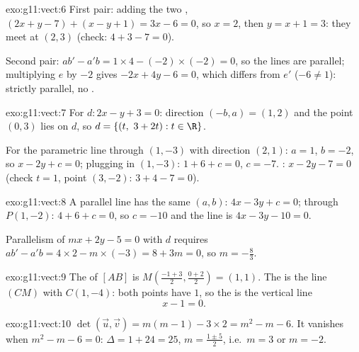 \begin{solution}{exo:g11:vect:6}
First pair: adding the two , $(2x + y - 7) + (x - y + 1) =
3x - 6 = 0$, so $x = 2$, then $y = x + 1 = 3$: they meet at $(2, 3)$
(check: $4 + 3 - 7 = 0$).

Second pair: $ab' - a'b = 1 \times 4 - (-2) \times (-2) = 0$, so the
lines are parallel; multiplying $e$ by $-2$ gives $-2x + 4y - 6 = 0$,
which differs from $e'$ ($-6 \neq 1$): strictly parallel, no
.
\end{solution}

\begin{solution}{exo:g11:vect:7}
For $d: 2x - y + 3 = 0$: direction $(-b, a) = (1, 2)$ and the point
$(0, 3)$ lies on $d$, so $d = \{(t,\ 3 + 2t) : t \in \R\}$.

For the parametric line through $(1, -3)$ with direction $(2, 1)$:
$a = 1$, $b = -2$, so $x - 2y + c = 0$; plugging in $(1, -3)$:
$1 + 6 + c = 0$, $c = -7$. : $x - 2y - 7 = 0$ (check $t = 1$,
point $(3, -2)$: $3 + 4 - 7 = 0$).
\end{solution}

\begin{solution}{exo:g11:vect:8}
A parallel line has the same $(a, b)$: $4x - 3y + c = 0$; through
$P(1, -2)$: $4 + 6 + c = 0$, so $c = -10$ and the line is
$4x - 3y - 10 = 0$.

Parallelism of $mx + 2y - 5 = 0$ with $d$ requires
$ab' - a'b = 4 \times 2 - m \times (-3) = 8 + 3m = 0$, so
$m = -\frac83$.
\end{solution}

\begin{solution}{exo:g11:vect:9}
The  of $[AB]$ is $M\!\left(\frac{-1+3}{2}, \frac{0+2}{2}\right)
= (1, 1)$. The  is the line $(CM)$ with $C(1, -4)$: both points
have  $1$, so the  is the vertical line
\[
x - 1 = 0 .
\]
\end{solution}

\begin{solution}{exo:g11:vect:10}
$\det(\vec u, \vec v) = m(m - 1) - 3 \times 2 = m^2 - m - 6$. It vanishes
when $m^2 - m - 6 = 0$: $\Delta = 1 + 24 = 25$, 
$m = \frac{1 \pm 5}{2}$, i.e.\ $m = 3$ or $m = -2$.
\end{solution}

